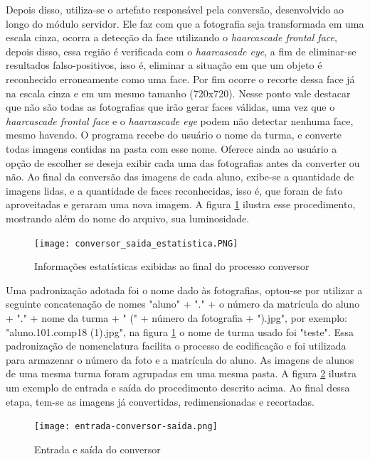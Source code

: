 Depois disso, utiliza-se o artefato responsável pela conversão, desenvolvido ao longo do módulo servidor. Ele faz com que a fotografia seja transformada em uma escala cinza, ocorra a detecção da face utilizando o \textit{haarcascade frontal face}, depois disso, essa região é verificada com o \textit{haarcascade eye}, a fim de eliminar-se resultados falso-positivos, isso é, eliminar a situação em que um objeto é reconhecido erroneamente como uma face. Por fim ocorre o recorte dessa face já na escala cinza e em um mesmo tamanho (720x720). Nesse ponto vale destacar que não são todas as fotografias que irão gerar faces válidas, uma vez que o \textit{haarcascade frontal face} e o \textit{haarcascade eye} podem não detectar nenhuma face, mesmo havendo. O programa recebe do usuário o nome da turma, e converte todas imagens contidas na pasta com esse nome. Oferece ainda ao usuário a opção de escolher se deseja exibir cada uma das fotografias antes da converter ou não. Ao final da conversão das imagens de cada aluno, exibe-se a quantidade de imagens lidas, e a quantidade de faces reconhecidas, isso é, que foram de fato aproveitadas e geraram uma nova imagem. A figura \ref{fig:figura51} ilustra esse procedimento, mostrando além do nome do arquivo, sua luminosidade. 

\begin{figure}[!ht]
	\centering
	\texttt{[image: conversor\_saida\_estatistica.PNG]}   
	\caption{Informações estatísticas exibidas ao final do processo conversor}
	\label{fig:figura51}
\end{figure}

Uma padronização adotada foi o nome dado às fotografias, optou-se por utilizar a seguinte concatenação de nomes "aluno" + "." + o número da matrícula do aluno + "." + nome da turma + " (" + número da fotografia + ").jpg", por exemplo: "aluno.101.comp18 (1).jpg", na figura \ref{fig:figura51} o nome  de turma usado foi "teste". Essa padronização de nomenclatura facilita o processo de codificação e foi utilizada para armazenar o número da foto e a matrícula do aluno. As imagens de alunos de uma mesma turma foram agrupadas em uma mesma pasta. A figura \ref{fig:figura52} ilustra um exemplo de entrada e saída do procedimento descrito acima. Ao final dessa etapa, tem-se as imagens já convertidas, redimensionadas e recortadas. 

\begin{figure}[!ht]
	\centering
	\texttt{[image: entrada-conversor-saida.png]}   
	\caption{Entrada e saída do conversor}
	\label{fig:figura52}
\end{figure}


